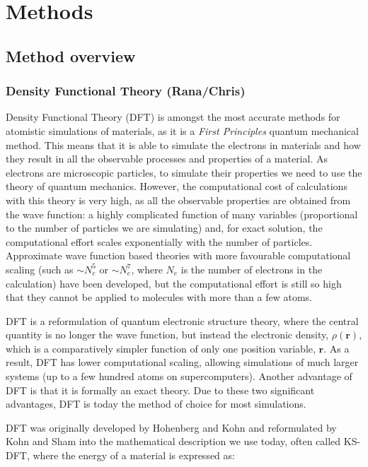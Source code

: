 \documentclass[../main.tex]{subfiles}
\begin{document}
\section{Methods}
\subsection{Method overview}
\label{sec:methods}

\subsubsection{Density Functional Theory (Rana/Chris)}
\label{sec:dft}
Density Functional Theory (DFT) is amongst the most accurate methods for atomistic simulations of materials, as it is a \textit{First Principles} quantum mechanical method. This means that it is able to simulate the electrons in materials and how they result in all the observable processes and properties of a  material. As electrons are microscopic particles, to simulate their properties we need to use the theory of quantum mechanics. However, the computational cost of calculations with this theory is very high, as all the observable properties are obtained from the wave function: a highly complicated function of many variables (proportional to the number of particles we are simulating) and, for exact solution, the computational effort scales exponentially with the number of particles. Approximate wave function based theories with more favourable computational scaling (such as $\sim N_e^5$ or $\sim N_e^7$, where $N_e$ is the number of electrons in the calculation) have been developed, but the computational effort is still so high that they cannot be applied to molecules with more than a few atoms.

DFT is a reformulation of quantum electronic structure theory, where the central quantity is no longer the wave function, but instead the electronic density, $\rho(\mathbf{r})$, which is a comparatively simpler function of only one position variable, $\mathbf{r}$. As a result, DFT has lower computational scaling, allowing simulations of much larger systems (up to a few hundred atoms on supercomputers). Another advantage of DFT is that it is formally an exact theory. Due to these two significant advantages, DFT is today the method of choice for most simulations.

DFT was originally developed by Hohenberg and Kohn \cite{parr,ph1964B864} and reformulated by Kohn and Sham \cite{wk1965A1133} into the mathematical description we use today, often called KS-DFT, where the energy of a material is expressed as:
\end{document}
